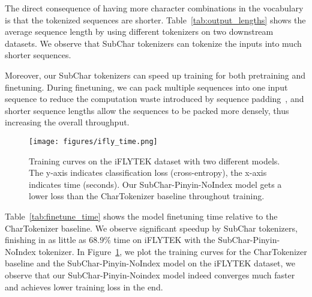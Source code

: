 The direct consequence of having more character combinations in the vocabulary is that the tokenized sequences are shorter. Table~\ref{tab:output_lengths} shows the average sequence length by using different tokenizers on two downstream datasets. 
We observe that SubChar tokenizers can tokenize the inputs into much shorter sequences.

Moreover, our SubChar tokenizers can speed up training for both pretraining and finetuning.
During finetuning, we can pack multiple sequences into one input sequence to reduce the computation waste introduced by sequence padding~\cite{kosec2021packing}, and shorter sequence lengths allow the sequences to be packed more densely, thus increasing the overall throughput.

 \begin{figure}[t]
\centering
\texttt{[image: figures/ifly\_time.png]}
\caption{Training curves on the iFLYTEK dataset with two different models. The y-axis indicates classification loss (cross-entropy), the x-axis indicates time (seconds). Our SubChar-Pinyin-NoIndex model gets a lower loss than the CharTokenizer baseline throughout training.}
\label{fig:ifly_loss_time}
\end{figure}



Table~\ref{tab:finetune_time} shows the model finetuning time relative to the CharTokenizer baseline. We observe significant speedup by SubChar tokenizers, finishing in as little as $68.9\%$ time on iFLYTEK with the SubChar-Pinyin-NoIndex tokenizer.
In Figure~\ref{fig:ifly_loss_time}, we plot the training curves for the CharTokenizer baseline and the SubChar-Pinyin-NoIndex model on the iFLYTEK dataset, we observe that our SubChar-Pinyin-Noindex model indeed converges much faster and achieves lower training loss in the end.  


